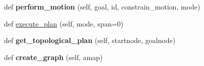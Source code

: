 \begin{DoxyCompactItemize}
def {\bfseries perform\+\_\+motion} (self, goal, id, constrain\+\_\+motion, mode)
\item 
def \hyperlink{classmbf__complex__planner_1_1SimpleTopoPlanner_a9eb51a878e3f7891274bad1e253b61f4}{execute\+\_\+plan} (self, mode, span=0)
\item 
\mbox{\label{classmbf__complex__planner_1_1SimpleTopoPlanner_a595c1c401ab85c83fd0a4506b1b44765}} 
def {\bfseries get\+\_\+topological\+\_\+plan} (self, startnode, goalnode)
\item 
\mbox{\label{classmbf__complex__planner_1_1SimpleTopoPlanner_a085cd3dd1cf3ef6e4e712b37baa67019}} 
def {\bfseries create\+\_\+graph} (self, amap)
\end{DoxyCompactItemize}
